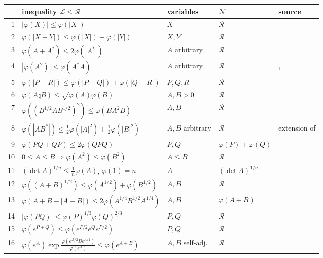 \documentclass[11pt]{article}
\newcommand{\cL}{\mathcal{L}}
\newcommand{\cR}{\mathcal{R}}
\newcommand{\cN}{\mathcal{N}}
\theoremstyle{plain}
\theoremstyle{definition}
\theoremstyle{remark}
\begin{document}
\begin{table}[h]
\centering\small
\setlength{\tabcolsep}{3pt}
\begin{tabular}{rllll}
\toprule
 & inequality $\cL\le\cR$ & variables & $\cN$ & source\\
\midrule
1 & $|\varphi(X)|\le\varphi(|X|)$ & $X$ & $\cR$ & \cite{gardner1979}\\
2 & $\varphi(|X+Y|)\le\varphi(|X|)+\varphi(|Y|)$ & $X,Y$ & $\cR$ & \cite{gardner1979,stolyarov2002}\\
3 & $\varphi(A+A^*)\le2\varphi(|A^*|)$ & $A$ arbitrary & $\cR$ & \cite{bikchentaev2019abed}\\
4 & $|\varphi(A^2)|\le\varphi(A^*A)$ & $A$ arbitrary & $\cR$ & \cite[Thm.~1, $k=2$]{petz1988}, \cite{bikchentaev2026moslehian}\\
5 & $\varphi(|P-R|)\le\varphi(|P-Q|)+\varphi(|Q-R|)$ & $P,Q,R$ & $\cR$ & \cite{bikchentaev2019metric}\\
6 & $\varphi(A\natural B)\le\sqrt{\varphi(A)\varphi(B)}$ & $A,B>0$ & $\cR$ & \cite{bikchentaev2026sgm}\\
7 & $\varphi((B^{1/2}AB^{1/2})^2)\le\varphi(BA^2B)$ & $A,B$ & $\cR$ & \cite[Lemma~2, $r=2$, $p=1$]{bikchentaev2011pb}\\
8 & $\varphi(|AB^*|)\le\frac12\varphi(|A|^2)+\frac12\varphi(|B|^2)$ & $A,B$ arbitrary & $\cR$ & extension of \cite{bikchentaev2005young}\\
9 & $\varphi(PQ+QP)\le2\varphi(QPQ)$ & $P,Q$ & $\varphi(P)+\varphi(Q)$ & \cite{bikchentaev2019abed}\\
10 & $0\le A\le B\Rightarrow\varphi(A^2)\le\varphi(B^2)$ & $A\le B$ & $\cR$ & \cite{bikchentaev2007mono,sano2006}\\
11 & $(\det A)^{1/n}\le\frac1n\varphi(A)$, $\varphi(1)=n$ & $A$ & $(\det A)^{1/n}$ & \cite[Thm.~3(iii)]{bikchentaev2020det}\\
12 & $\varphi((A+B)^{1/2})\le\varphi(A^{1/2})+\varphi(B^{1/2})$ & $A,B$ & $\cR$ & \cite[Cor.~1]{tikhonov2005}\\
13 & $\varphi(A+B-|A-B|)\le2\varphi(A^{1/4}B^{1/2}A^{1/4})$ & $A,B$ & $\varphi(A+B)$ & \cite[Lemma~3.1]{hoa2013}\\
14 & $|\varphi(PQ)|\le\varphi(P)^{1/3}\varphi(Q)^{2/3}$ & $P,Q$ & $\cR$ & \cite[Thm.~2(i)]{bikchentaev2011mn}\\
15 & $\varphi(e^{P+Q})\le\varphi(e^{P/2}e^Qe^{P/2})$ & $P,Q$ & $\cR$ & \cite[Thm.~2(iv)]{bikchentaev2011mn}\\
16 & $\varphi(e^A)\exp\frac{\varphi(e^{A/2}Be^{A/2})}{\varphi(e^A)}\le\varphi(e^{A+B})$ & $A,B$ self-adj.\ & $\cR$ &

\end{tabular}
\end{table}
\end{document}
